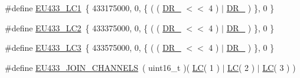 \begin{DoxyCompactItemize}
\#define \mbox{\hyperlink{group___r_e_g_i_o_n_e_u433_ga6daaeb48d51083fc5de9a57011ec3757}{E\+U433\+\_\+\+L\+C1}}~\{ 433175000, 0, \{ ( ( \mbox{\hyperlink{group___r_e_g_i_o_n_ga872e12c82020c02a7f70a1c6ed1375df}{D\+R\+\_}} $<$$<$ 4 ) $\vert$ \mbox{\hyperlink{group___r_e_g_i_o_n_ga6c4ef966b4f3d5eb7597b087f2b97095}{D\+R\+\_}} ) \}, 0 \}
\item 
\#define \mbox{\hyperlink{group___r_e_g_i_o_n_e_u433_gae1c54a191172715ddc7c0c7f900009b7}{E\+U433\+\_\+\+L\+C2}}~\{ 433375000, 0, \{ ( ( \mbox{\hyperlink{group___r_e_g_i_o_n_ga872e12c82020c02a7f70a1c6ed1375df}{D\+R\+\_}} $<$$<$ 4 ) $\vert$ \mbox{\hyperlink{group___r_e_g_i_o_n_ga6c4ef966b4f3d5eb7597b087f2b97095}{D\+R\+\_}} ) \}, 0 \}
\item 
\#define \mbox{\hyperlink{group___r_e_g_i_o_n_e_u433_ga4e6b881bf178cbd3cc8ab2716a24a231}{E\+U433\+\_\+\+L\+C3}}~\{ 433575000, 0, \{ ( ( \mbox{\hyperlink{group___r_e_g_i_o_n_ga872e12c82020c02a7f70a1c6ed1375df}{D\+R\+\_}} $<$$<$ 4 ) $\vert$ \mbox{\hyperlink{group___r_e_g_i_o_n_ga6c4ef966b4f3d5eb7597b087f2b97095}{D\+R\+\_}} ) \}, 0 \}
\item 
\#define \mbox{\hyperlink{group___r_e_g_i_o_n_e_u433_ga68f08c679de44a903e7c2b0b57a31e00}{E\+U433\+\_\+\+J\+O\+I\+N\+\_\+\+C\+H\+A\+N\+N\+E\+LS}}~( uint16\+\_\+t )( \mbox{\hyperlink{group___r_e_g_i_o_n_ga12fa17e5c1016e01a9d82c25027deb1b}{LC}}( 1 ) $\vert$ \mbox{\hyperlink{group___r_e_g_i_o_n_ga12fa17e5c1016e01a9d82c25027deb1b}{LC}}( 2 ) $\vert$ \mbox{\hyperlink{group___r_e_g_i_o_n_ga12fa17e5c1016e01a9d82c25027deb1b}{LC}}( 3 ) )
\end{DoxyCompactItemize}
